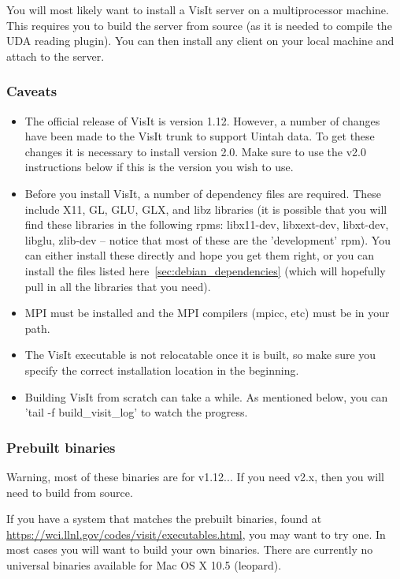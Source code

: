 \documentclass[12pt]{article}
\begin{document}
You will most likely want to install a VisIt server on a
multiprocessor machine. This requires you to build the server from
source (as it is needed to compile the UDA reading plugin). You can
then install any client on your local machine and attach to the
server.

\subsubsection{Caveats}
\label{subsec:VisIt_Caveats}
\begin{itemize}
\item The official release of VisIt is version 1.12.  However, a
  number of changes have been made to the VisIt trunk to support
  Uintah data. To get these changes it is necessary to install version
  2.0.  Make sure to use the v2.0 instructions below if this is the
  version you wish to use.
\item Before you install VisIt, a number of dependency files are
  required.  These include X11, GL, GLU, GLX, and libz libraries (it is possible
  that you will find these libraries in the following rpms:
  libx11-dev, libxext-dev, libxt-dev, libglu, zlib-dev -- notice that
  most of these are the 'development' rpm).  You can either install
  these directly and hope you get them right, or you can install the
  files listed here~\ref{sec:debian_dependencies} (which will
  hopefully pull in all the libraries that you need).
\item MPI must be installed and the MPI compilers (mpicc, etc) must be
  in your path.
\item The VisIt executable is not relocatable once it is built, so
  make sure you specify the correct installation location in the
  beginning.
\item Building VisIt from scratch can take a while.  As mentioned
  below, you can 'tail -f build_visit_log' to watch the progress.

\end{itemize}

\subsubsection{Prebuilt binaries}
\label{subsec:PrebuiltBinaries}

Warning, most of these binaries are for v1.12... If you need v2.x, then you
will need to build from source.

If you have a system that matches the prebuilt binaries, found at
\url{https://wci.llnl.gov/codes/visit/executables.html}, you may want
to try one. In most cases you will want to build your own
binaries. There are currently no universal binaries available for Mac
OS X 10.5 (leopard).
\end{document}
